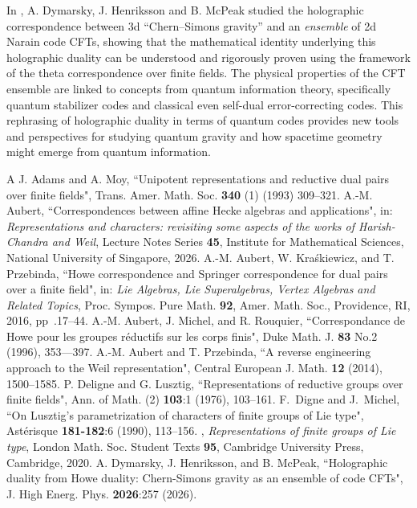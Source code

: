 \documentclass[12pt]{amsart}
\numberwithin{equation}{subsection}
\begin{document}
In \cite{DHM}, A. Dymarsky, J. Henriksson and B. McPeak studied  the holographic correspondence between 3d ``Chern–Simons gravity” and an \textit{ensemble} of 2d Narain code CFTs, showing that the mathematical identity underlying this holographic duality can be understood and rigorously proven using the framework of the theta correspondence over finite fields. The physical properties of the CFT  ensemble are linked to concepts from quantum information theory, specifically quantum stabilizer codes and classical even self-dual error-correcting codes. This rephrasing of holographic duality in terms of quantum codes provides new tools and perspectives for studying quantum gravity and how spacetime geometry might emerge from quantum information.

\begin{thebibliography}{A}
 J. Adams and A. Moy, ``Unipotent representations and reductive dual pairs over finite fields", Trans. Amer. Math. Soc. \textbf{340} (1) (1993) 309--321.
  A.-M. Aubert, ``Correspondences between affine Hecke algebras and applications", in: \textit{Representations and characters: revisiting some aspects of the works of Harish-Chandra and Weil}, Lecture Notes Series
\textbf{45}, Institute for Mathematical Sciences, National University of Singapore, 2026.
 A.-M. Aubert, W. Kra\'skiewicz, and T. Przebinda, ``Howe correspondence and Springer correspondence for dual pairs over a finite field",  in: \textit{Lie Algebras, Lie 
Superalgebras, Vertex Algebras and Related Topics}, Proc. Sympos. Pure Math. \textbf{92}, Amer. Math. Soc., Providence, RI, 2016, pp~.17--44.
 A.-M. Aubert,  J. Michel, and R. Rouquier, ``Correspondance de Howe pour les groupes r\'eductifs sur les corps finis", Duke Math. J. \textbf{83} No.2 (1996), 353---397.
  A.-M. Aubert and T. Przebinda, ``A reverse engineering approach to the Weil representation", Central European J.  Math. \textbf{12} (2014), 1500--1585.
 P. Deligne  and G. Lusztig, ``Representations of reductive groups over finite fields", Ann. of Math. (2) \textbf{103}:1 (1976), 103--161.
 F.~Digne and J.~Michel, ``On Lusztig's parametrization of characters of finite groups of Lie type",  Ast\'erisque \textbf{181-182}:6 (1990),  113--156.
 \bysame,  \emph{Representations of finite groups of Lie type}, London Math. Soc. Student Texts \textbf{95}, Cambridge University Press, Cambridge, 2020.
 A. Dymarsky, J. Henriksson, and B. McPeak, ``Holographic duality from Howe duality: Chern-Simons gravity as an ensemble of code CFTs", J. High Energ. Phys. \textbf{2026}:257 (2026). 

\end{thebibliography}
\end{document}
